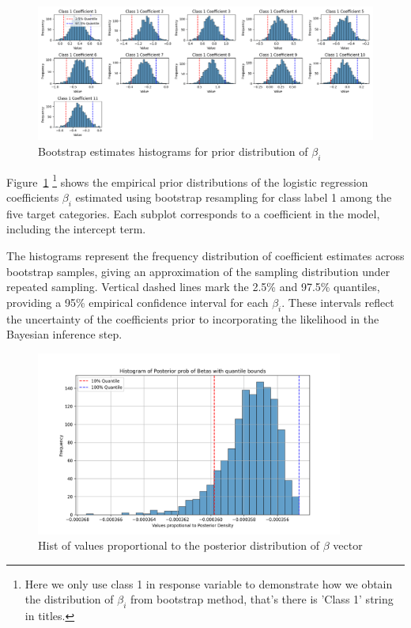 \begin{figure}[!h]
    \centering
    \includegraphics[width=1\textwidth]{../results/ModelFitting2/bootstrap_estimates_histograms.png}
    \caption{Bootstrap estimates histograms for prior distribution of $\beta_i$}
    \label{fig:bootstrap_estimates_histograms}
\end{figure}

Figure~\ref{fig:bootstrap_estimates_histograms}
\footnote{Here we only use class 1 in response variable to demonstrate how we obtain the distribution of 
$\beta_i$ from bootstrap method, that's there is 'Class 1' string in titles.} 
shows the empirical prior distributions of the
logistic regression coefficients $\beta_i$ estimated using bootstrap
resampling for class label 1 among the five target categories.
Each subplot corresponds to a coefficient in the model, including the intercept term. 

The histograms represent the frequency distribution of coefficient estimates across 
bootstrap samples, giving an approximation of the sampling distribution under repeated sampling. 
Vertical dashed lines mark the 2.5\% and 97.5\% quantiles, providing a 95\% empirical confidence 
interval for each $\beta_i$. These intervals reflect the uncertainty of the coefficients prior 
to incorporating the likelihood in the Bayesian inference step.

\begin{figure}[!h]
    \centering
    \includegraphics[width=0.9\textwidth]{../results/ModelFitting2/bayesian_posterior_density_histogram.png}
    \caption{Hist of values proportional to the posterior distribution of $\beta$ vector}
    \label{fig:bayesian_posterior_density_histogram}
\end{figure}

